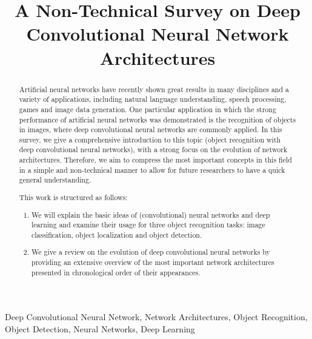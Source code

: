 \documentclass[conference]{IEEEtran}
\begin{document}
\title{A Non-Technical Survey on Deep Convolutional Neural Network Architectures}

\author{
\and
{}
}

\maketitle



\begin{abstract}
Artificial neural networks have recently shown great results in many disciplines and a variety of applications, including natural language understanding, speech processing, games and image data generation. One particular application in which the strong performance of artificial neural networks was demonstrated is the recognition of objects in images, where deep convolutional neural networks are commonly applied. 
In this survey, we give a comprehensive introduction to this topic (object recognition with deep convolutional neural networks), with a strong focus on the evolution of network architectures. Therefore, we aim to compress the most important concepts in this field in a simple and non-technical manner to allow for future researchers to have a quick general understanding.

This work is structured as follows: 
\begin{enumerate}
\item We will explain the basic ideas of (convolutional) neural networks and deep learning and examine their usage for three object recognition tasks: image classification, object localization and object detection.
\item We give a review on the evolution of deep convolutional neural networks by providing an extensive overview of the most important network architectures presented in chronological order of their appearances. 
\end{enumerate}
\end{abstract}



\begin{IEEEkeywords}
Deep Convolutional Neural Network, Network Architectures, Object Recognition, Object Detection, Neural Networks, Deep Learning
\end{IEEEkeywords}
\end{document}
